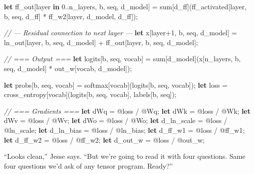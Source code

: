 \documentclass[11pt,]{article}
\newenvironment{Shaded}{}{}
\newcommand{\CommentTok}[1]{\textcolor[rgb]{0.38,0.63,0.69}{\textit{#1}}}
\newcommand{\DecValTok}[1]{\textcolor[rgb]{0.25,0.63,0.44}{#1}}
\newcommand{\KeywordTok}[1]{\textcolor[rgb]{0.00,0.44,0.13}{\textbf{#1}}}
\newcommand{\NormalTok}[1]{#1}
\newcommand{\OperatorTok}[1]{\textcolor[rgb]{0.40,0.40,0.40}{#1}}
\begin{document}
\begin{Shaded}
\begin{Highlighting}[]
\KeywordTok{let}\NormalTok{ ff_out}\OperatorTok{[}\NormalTok{layer }\KeywordTok{in} \DecValTok{0.}\NormalTok{.n_layers, b, seq, d_model}\OperatorTok{]}\NormalTok{ =}
\NormalTok{    sum}\OperatorTok{[}\NormalTok{d_ff}\OperatorTok{]}\NormalTok{(ff_activated}\OperatorTok{[}\NormalTok{layer, b, seq, d_ff}\OperatorTok{]}\NormalTok{ *}
\NormalTok{               ff_w2}\OperatorTok{[}\NormalTok{layer, d_model, d_ff}\OperatorTok{]}\NormalTok{);}

\CommentTok{// --- Residual connection to next layer ---}
\KeywordTok{let}\NormalTok{ x}\OperatorTok{[}\NormalTok{layer+}\DecValTok{1}\NormalTok{, b, seq, d_model}\OperatorTok{]}\NormalTok{ =}
\NormalTok{    ln_out}\OperatorTok{[}\NormalTok{layer, b, seq, d_model}\OperatorTok{]}\NormalTok{ + ff_out}\OperatorTok{[}\NormalTok{layer, b, seq, d_model}\OperatorTok{]}\NormalTok{;}

\CommentTok{// === Output ===}
\KeywordTok{let}\NormalTok{ logits}\OperatorTok{[}\NormalTok{b, seq, vocab}\OperatorTok{]}\NormalTok{ =}
\NormalTok{    sum}\OperatorTok{[}\NormalTok{d_model}\OperatorTok{]}\NormalTok{(x}\OperatorTok{[}\NormalTok{n_layers, b, seq, d_model}\OperatorTok{]}\NormalTok{ * out_w}\OperatorTok{[}\NormalTok{vocab, d_model}\OperatorTok{]}\NormalTok{);}

\KeywordTok{let}\NormalTok{ probs}\OperatorTok{[}\NormalTok{b, seq, vocab}\OperatorTok{]}\NormalTok{ = softmax}\OperatorTok{[}\NormalTok{vocab}\OperatorTok{]}\NormalTok{(logits}\OperatorTok{[}\NormalTok{b, seq, vocab}\OperatorTok{]}\NormalTok{);}
\KeywordTok{let}\NormalTok{ loss = cross_entropy}\OperatorTok{[}\NormalTok{vocab}\OperatorTok{]}\NormalTok{(logits}\OperatorTok{[}\NormalTok{b, seq, vocab}\OperatorTok{]}\NormalTok{, labels}\OperatorTok{[}\NormalTok{b, seq}\OperatorTok{]}\NormalTok{);}

\CommentTok{// === Gradients ===}
\KeywordTok{let}\NormalTok{ dWq = @loss / @Wq;}
\KeywordTok{let}\NormalTok{ dWk = @loss / @Wk;}
\KeywordTok{let}\NormalTok{ dWv = @loss / @Wv;}
\KeywordTok{let}\NormalTok{ dWo = @loss / @Wo;}
\KeywordTok{let}\NormalTok{ d_ln_scale = @loss / @ln_scale;}
\KeywordTok{let}\NormalTok{ d_ln_bias = @loss / @ln_bias;}
\KeywordTok{let}\NormalTok{ d_ff_w1 = @loss / @ff_w1;}
\KeywordTok{let}\NormalTok{ d_ff_w2 = @loss / @ff_w2;}
\KeywordTok{let}\NormalTok{ d_out_w = @loss / @out_w;}
\end{Highlighting}
\end{Shaded}

``Looks clean,'' Jesse says. ``But we're going to read it with four
questions. Same four questions we'd ask of any tensor program. Ready?''
\end{document}
